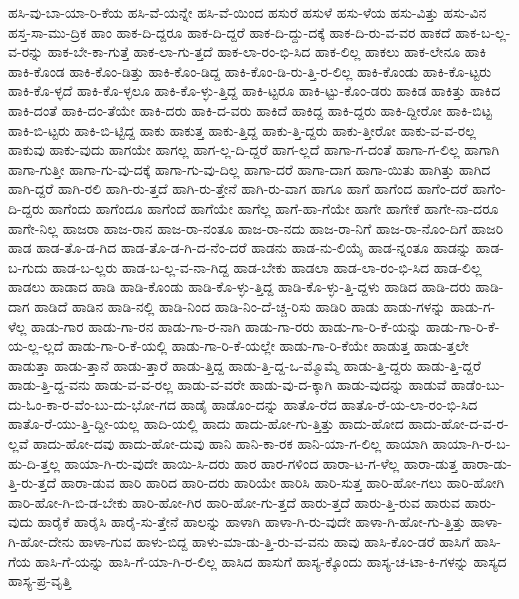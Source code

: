 {ಹಸಿ-ವು-ಬಾ-ಯಾ-ರಿ-ಕೆಯ
ಹಸಿ-ವೆ-ಯನ್ನೇ
ಹಸಿ-ವೆ-ಯಿಂದ
ಹಸುರೆ
ಹಸುಳೆ
ಹಸು-ಳೆಯ
ಹಸು-ವಿತ್ತು
ಹಸು-ವಿನ
ಹಸ್ತ-ಸಾ-ಮು-ದ್ರಿಕ
ಹಾಂ
ಹಾಕ-ದಿ-ದ್ದರೂ
ಹಾಕ-ದಿ-ದ್ದರೆ
ಹಾಕ-ದಿ-ದ್ದು-ದಕ್ಕೆ
ಹಾಕ-ದಿ-ರು-ವ-ವರ
ಹಾಕದೆ
ಹಾಕ-ಬ-ಲ್ಲ-ವ-ರನ್ನು
ಹಾಕ-ಬೇ-ಕಾ-ಗುತ್ತೆ
ಹಾಕ-ಲಾ-ಗು-ತ್ತದೆ
ಹಾಕ-ಲಾ-ರಂ-ಭಿ-ಸಿದ
ಹಾಕ-ಲಿಲ್ಲ
ಹಾಕಲು
ಹಾಕ-ಲೇನೂ
ಹಾಕಿ
ಹಾಕಿ-ಕೊಂಡ
ಹಾಕಿ-ಕೊಂ-ಡಿತ್ತು
ಹಾಕಿ-ಕೊಂ-ಡಿದ್ದ
ಹಾಕಿ-ಕೊಂ-ಡಿ-ರು-ತ್ತಿ-ರ-ಲಿಲ್ಲ
ಹಾಕಿ-ಕೊಂಡು
ಹಾಕಿ-ಕೊ-ಟ್ಟರು
ಹಾಕಿ-ಕೊ-ಳ್ಳದೆ
ಹಾಕಿ-ಕೊ-ಳ್ಳಲೂ
ಹಾಕಿ-ಕೊ-ಳ್ಳು-ತ್ತಿದ್ದ
ಹಾಕಿ-ಟ್ಟರೂ
ಹಾಕಿ-ಟ್ಟು-ಕೊಂ-ಡರು
ಹಾಕಿಡ
ಹಾಕಿತ್ತು
ಹಾಕಿದ
ಹಾಕಿ-ದಂತೆ
ಹಾಕಿ-ದಂ-ತೆಯೇ
ಹಾಕಿ-ದರು
ಹಾಕಿ-ದ-ವರು
ಹಾಕಿದೆ
ಹಾಕಿದ್ದ
ಹಾಕಿ-ದ್ದರು
ಹಾಕಿ-ದ್ದೀರೋ
ಹಾಕಿ-ಬಿಟ್ಟ
ಹಾಕಿ-ಬಿ-ಟ್ಟರು
ಹಾಕಿ-ಬಿ-ಟ್ಟಿದ್ದ
ಹಾಕು
ಹಾಕುತ್ತ
ಹಾಕು-ತ್ತಿದ್ದ
ಹಾಕು-ತ್ತಿ-ದ್ದರು
ಹಾಕು-ತ್ತೀರೋ
ಹಾಕು-ವ-ವ-ರಲ್ಲ
ಹಾಕುವು
ಹಾಕು-ವುದು
ಹಾಗಯೇ
ಹಾಗಲ್ಲ
ಹಾಗ-ಲ್ಲ-ದಿ-ದ್ದರೆ
ಹಾಗ-ಲ್ಲದೆ
ಹಾಗಾ-ಗ-ದಂತೆ
ಹಾಗಾ-ಗ-ಲಿಲ್ಲ
ಹಾಗಾಗಿ
ಹಾಗಾ-ಗುತ್ತೀ
ಹಾಗಾ-ಗು-ವು-ದಕ್ಕೆ
ಹಾಗಾ-ಗು-ವು-ದಿಲ್ಲ
ಹಾಗಾ-ದರೆ
ಹಾಗಾ-ದಾಗ
ಹಾಗಾ-ಯಿತು
ಹಾಗಿತ್ತು
ಹಾಗಿದ
ಹಾಗಿ-ದ್ದರೆ
ಹಾಗಿ-ರಲಿ
ಹಾಗಿ-ರು-ತ್ತದೆ
ಹಾಗಿ-ರು-ತ್ತೇನೆ
ಹಾಗಿ-ರು-ವಾಗ
ಹಾಗೂ
ಹಾಗೆ
ಹಾಗೆಂದ
ಹಾಗೆಂ-ದರೆ
ಹಾಗೆಂ-ದಿ-ದ್ದರು
ಹಾಗೆಂದು
ಹಾಗೆಂದೂ
ಹಾಗೆಂದೆ
ಹಾಗೆಯೇ
ಹಾಗೆಲ್ಲ
ಹಾಗೆ-ಹಾ-ಗೆಯೇ
ಹಾಗೇ
ಹಾಗೇಕೆ
ಹಾಗೇ-ನಾ-ದರೂ
ಹಾಗೇ-ನಿಲ್ಲ
ಹಾಜರಾ
ಹಾಜ-ರಾನ
ಹಾಜ-ರಾ-ನಂತೂ
ಹಾಜ-ರಾ-ನದು
ಹಾಜ-ರಾ-ನಿಗೆ
ಹಾಜ-ರಾ-ನೊಂ-ದಿಗೆ
ಹಾಜರಿ
ಹಾಡ
ಹಾಡ-ತೊ-ಡ-ಗಿದ
ಹಾಡ-ತೊ-ಡ-ಗಿ-ದ-ನೆಂ-ದರೆ
ಹಾಡನು
ಹಾಡ-ನು-ಲಿಯೈ
ಹಾಡ-ನ್ನಂತೂ
ಹಾಡನ್ನು
ಹಾಡ-ಬ-ಗುದು
ಹಾಡ-ಬ-ಲ್ಲರು
ಹಾಡ-ಬ-ಲ್ಲ-ವ-ನಾ-ಗಿದ್ದ
ಹಾಡ-ಬೇಕು
ಹಾಡಲಾ
ಹಾಡ-ಲಾ-ರಂ-ಭಿ-ಸಿದ
ಹಾಡ-ಲಿಲ್ಲ
ಹಾಡಲು
ಹಾಡಾದ
ಹಾಡಿ
ಹಾಡಿ-ಕೊಂಡು
ಹಾಡಿ-ಕೊ-ಳ್ಳು-ತ್ತಿದ್ದ
ಹಾಡಿ-ಕೊ-ಳ್ಳು-ತ್ತಿ-ದ್ದಳು
ಹಾಡಿದ
ಹಾಡಿ-ದರು
ಹಾಡಿ-ದಾಗ
ಹಾಡಿದೆ
ಹಾಡಿನ
ಹಾಡಿ-ನಲ್ಲಿ
ಹಾಡಿ-ನಿಂದ
ಹಾಡಿ-ನಿಂ-ದೆ-ಚ್ಚ-ರಿಸು
ಹಾಡಿರಿ
ಹಾಡು
ಹಾಡು-ಗಳನ್ನು
ಹಾಡು-ಗ-ಳೆಲ್ಲ
ಹಾಡು-ಗಾರ
ಹಾಡು-ಗಾ-ರನ
ಹಾಡು-ಗಾ-ರ-ನಾಗಿ
ಹಾಡು-ಗಾ-ರರು
ಹಾಡು-ಗಾ-ರಿ-ಕೆ-ಯನ್ನು
ಹಾಡು-ಗಾ-ರಿ-ಕೆ-ಯ-ಲ್ಲ-ಲ್ಲದೆ
ಹಾಡು-ಗಾ-ರಿ-ಕೆ-ಯಲ್ಲಿ
ಹಾಡು-ಗಾ-ರಿ-ಕೆ-ಯಲ್ಲೇ
ಹಾಡು-ಗಾ-ರಿ-ಕೆಯೇ
ಹಾಡುತ್ತ
ಹಾಡು-ತ್ತಲೇ
ಹಾಡುತ್ತಾ
ಹಾಡು-ತ್ತಾನೆ
ಹಾಡು-ತ್ತಾರೆ
ಹಾಡು-ತ್ತಿದ್ದ
ಹಾಡು-ತ್ತಿ-ದ್ದ-ಒ-ಮ್ಮೊಮ್ಮೆ
ಹಾಡು-ತ್ತಿ-ದ್ದರು
ಹಾಡು-ತ್ತಿ-ದ್ದರೆ
ಹಾಡು-ತ್ತಿ-ದ್ದ-ವನು
ಹಾಡು-ವ-ವ-ರಲ್ಲ
ಹಾಡು-ವ-ವರೇ
ಹಾಡು-ವು-ದ-ಕ್ಕಾಗಿ
ಹಾಡು-ವುದನ್ನು
ಹಾಡುವೆ
ಹಾಡೆಂ-ಬು-ದು-ಓಂ-ಕಾ-ರ-ವೆಂ-ಬು-ದು-ಭೋ-ಗದ
ಹಾಡೈ
ಹಾಡೊಂ-ದನ್ನು
ಹಾತೊ-ರೆದ
ಹಾತೊ-ರೆ-ಯ-ಲಾ-ರಂ-ಭಿ-ಸಿದ
ಹಾತೊ-ರೆ-ಯು-ತ್ತಿ-ದ್ದೀ-ಯಲ್ಲ
ಹಾದಿ-ಯಲ್ಲಿ
ಹಾದು
ಹಾದು-ಹೋ-ಗು-ತ್ತಿತ್ತು
ಹಾದು-ಹೋದ
ಹಾದು-ಹೋ-ದ-ವ-ರ-ಲ್ಲವೆ
ಹಾದು-ಹೋ-ದವು
ಹಾದು-ಹೋ-ದುವು
ಹಾನಿ
ಹಾನಿ-ಕಾ-ರಕ
ಹಾನಿ-ಯಾ-ಗ-ಲಿಲ್ಲ
ಹಾಯಾಗಿ
ಹಾಯಾ-ಗಿ-ರ-ಬ-ಹು-ದಿ-ತ್ತಲ್ಲ
ಹಾಯಾ-ಗಿ-ರು-ವುದೇ
ಹಾಯಿ-ಸಿ-ದರು
ಹಾರ
ಹಾರ-ಗಳಿಂದ
ಹಾರಾ-ಟ-ಗ-ಳೆಲ್ಲ
ಹಾರಾ-ಡುತ್ತ
ಹಾರಾ-ಡು-ತ್ತಿ-ರು-ತ್ತದೆ
ಹಾರಾ-ಡುವ
ಹಾರಿ
ಹಾರಿದ
ಹಾರಿ-ದರು
ಹಾರಿಯೇ
ಹಾರಿಸಿ
ಹಾರಿ-ಸುತ್ತ
ಹಾರಿ-ಹೋ-ಗಲು
ಹಾರಿ-ಹೋಗಿ
ಹಾರಿ-ಹೋ-ಗಿ-ಬಿ-ಡ-ಬೇಕು
ಹಾರಿ-ಹೋ-ಗಿರ
ಹಾರಿ-ಹೋ-ಗು-ತ್ತದೆ
ಹಾರು-ತ್ತದೆ
ಹಾರು-ತ್ತಿ-ರುವ
ಹಾರುವ
ಹಾರು-ವುದು
ಹಾರೈಕೆ
ಹಾರೈಸಿ
ಹಾರೈ-ಸು-ತ್ತೇನೆ
ಹಾಲನ್ನು
ಹಾಳಾಗಿ
ಹಾಳಾ-ಗಿ-ರು-ವುದೇ
ಹಾಳಾ-ಗಿ-ಹೋ-ಗು-ತ್ತಿತ್ತು
ಹಾಳಾ-ಗಿ-ಹೋ-ದೇನು
ಹಾಳಾ-ಗುವ
ಹಾಳು-ಬಿದ್ದ
ಹಾಳು-ಮಾ-ಡು-ತ್ತಿ-ರು-ವ-ವನು
ಹಾವು
ಹಾಸಿ-ಕೊಂ-ಡರೆ
ಹಾಸಿಗೆ
ಹಾಸಿ-ಗೆಯ
ಹಾಸಿ-ಗೆ-ಯನ್ನು
ಹಾಸಿ-ಗೆ-ಯಾ-ಗಿ-ರ-ಲಿಲ್ಲ
ಹಾಸಿದ
ಹಾಸುಗೆ
ಹಾಸ್ಯ-ಕ್ಕೊಂದು
ಹಾಸ್ಯ-ಚ-ಟಾ-ಕಿ-ಗಳನ್ನು
ಹಾಸ್ಯದ
ಹಾಸ್ಯ-ಪ್ರ-ವೃತ್ತಿ
}
